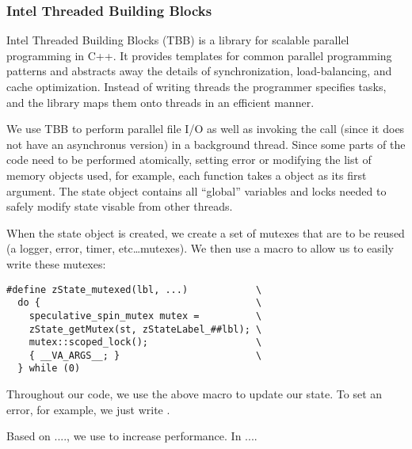 
\subsubsection{Intel Threaded Building Blocks}
Intel Threaded Building Blocks\cite{reinders2007intel} (TBB) is a library for
scalable parallel
programming in C++. It provides templates for common parallel programming
patterns and abstracts away the details of synchronization, load-balancing,
and cache optimization. Instead of writing threads the programmer specifies
tasks, and the library maps them onto threads in an efficient manner.

We use TBB to perform parallel file I/O as well as invoking the
	 call (since it does not have an asynchronus version)
	in a background thread.
Since some parts of the code need to be performed atomically, 
	setting error or modifying the list of memory objects used, for example,
	each function takes a  object as its first argument.
The state object contains all ``global'' variables and locks needed to 
	safely modify state visable from other threads.


When the state object is created, we create a set of mutexes that
	are to be reused (a logger, error, timer, etc\ldots mutexes).
We then use a macro to allow us to easily write these mutexes:

\begin{verbatim}
#define zState_mutexed(lbl, ...)            \
  do {                                      \
    speculative_spin_mutex mutex =          \
    zState_getMutex(st, zStateLabel_##lbl); \
    mutex::scoped_lock();                   \
    { __VA_ARGS__; }                        \
  } while (0)
\end{verbatim}


Throughout our code, we use the above macro to update our state.
To set an error, for example, we just write .


Based on ...., we use  to increase performance.
In ....
\todo[inline]{Why we use \fix{speculative\_spin\_mutex}}